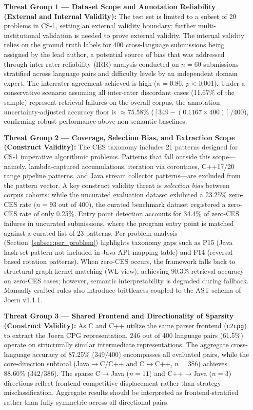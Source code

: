 {\textbf{Threat Group 1 --- Dataset Scope and Annotation Reliability (External and Internal Validity):}
The test set is limited to a subset of 20 problems in CS-1, setting an external validity boundary; further multi-institutional validation is needed to prove external validity. The internal validity relies on the ground truth labels for 400 cross-language submissions being assigned by the lead author, a potential source of bias that was addressed through inter-rater reliability (IRR) analysis conducted on $n=60$ submissions stratified across language pairs and difficulty levels by an independent domain expert. The interrater agreement achieved is high ($\kappa = 0.86$, $p < 0.001$). Under a conservative scenario assuming all inter-rater discordant cases (11.67\% of the sample) represent retrieval failures on the overall corpus, the annotation-uncertainty-adjusted accuracy floor is $\approx 75.58\%$ ($[349 - (0.1167 \times 400)]/400$), confirming robust performance above non-semantic baselines.

\textbf{Threat Group 2 --- Coverage, Selection Bias, and Extraction Scope (Construct Validity):}
The CES taxonomy includes 21 patterns designed for CS-1 imperative algorithmic problems. Patterns that fall outside this scope---namely, lambda-captured accumulations, iteration via coroutines, C++17/20 range pipeline patterns, and Java stream collector patterns---are excluded from the pattern vector. A key construct validity threat is \textit{selection bias} between corpus cohorts: while the uncurated evaluation dataset exhibited a 23.25\% zero-CES rate ($n=93$ out of 400), the curated benchmark dataset registered a zero-CES rate of only 0.25\%. Entry point detection accounts for 34.4\% of zero-CES failures in uncurated submissions, where the program entry point is matched against a curated list of 23 patterns. Per-problem analysis (Section~\ref{subsec:per_problem}) highlights taxonomy gaps such as P15 (Java hash-set pattern not included in Java API mapping table) and P14 (reversal-based rotation patterns). When zero-CES occurs, the framework falls back to structural graph kernel matching (WL view), achieving 90.3\% retrieval accuracy on zero-CES cases; however, semantic interpretability is degraded during fallback. Manually crafted rules also introduce brittleness coupled to the AST schema of Joern v1.1.1.

\textbf{Threat Group 3 --- Shared Frontend and Directionality of Sparsity (Construct Validity):}
As C and C++ utilize the same parser frontend (\texttt{c2cpg}) to extract the Joern CPG representation, 246 out of 400 language pairs (61.5\%) operate on structurally similar intermediate representations. The aggregate cross-language accuracy of 87.25\% ($349/400$) encompasses all evaluated pairs, while the core-direction subtotal (Java$\rightarrow$C/C++ and C$\leftrightarrow$C++, $n=386$) achieves 88.60\% ($342/386$). The sparse C$\rightarrow$Java ($n=11$) and C++$\rightarrow$Java ($n=3$) directions reflect frontend competitive displacement rather than strategy misclassification. Aggregate results should be interpreted as frontend-stratified rather than fully symmetric across all directional pairs.

}
